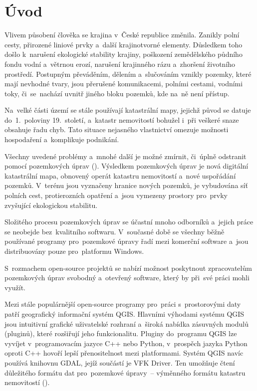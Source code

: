 \chapter{Úvod}
\label{1-uvod}

Vlivem působení člověka se krajina v~České republice změnila. Zanikly polní cesty, přirozené liniové prvky a~další krajinotvorné elementy. Důsledkem toho došlo k~naru\-šení ekologické stability krajiny, poškození zemědělského půdního fondu vodní a~vě\-trnou erozí, narušení krajinného rázu a~zhoršení životního prostředí. Postupným převáděním, dělením a~slučováním vznikly pozemky, které mají nevhodné tvary, jsou přerušené komunikacemi, polními cestami, vodními toky, či~se~nachází uvnitř jiného bloku pozemků, kde na~ně není přístup.

Na~velké části území se stále používají katastrální mapy, jejichž původ se datuje do~1.~poloviny 19.~století, a~katastr nemovitostí bohužel i~při veškeré snaze obsahuje řadu chyb. Tato situace nejasného vlastnictví omezuje možnosti hospodaření a~komplikuje podnikání.

Všechny uvedené problémy a~mnohé další je možné zmírnit, či~úplně odstranit pomocí pozemkových úprav (). Výsledkem pozemkových úprav je nová digi\-tální katastrální mapa, obnovený operát katastru nemovitostí a~nové uspořádání pozemků. V~terénu jsou vyznačeny hranice nových pozemků, je vybudována síť polních cest, protierozních opatření a~jsou vymezeny prostory pro~prvky zvyšující ekologickou stabilitu.

Složitého procesu pozemkových úprav se účastní mnoho odborníků a~jejich práce se neobejde bez~kvalitního softwaru. V~současné době se všechny běžně používané programy pro~pozemkové úpravy řadí mezi komerční software a~jsou distribuovány pouze pro~platformu Windows.

S~rozmachem open-source projektů se nabízí možnost poskytnout zpracovatelům pozemkových úprav svobodný a~otevřený software, který by při~své práci mohli využít.

Mezi stále populárnější open-source programy pro~práci s~prostorovými daty patří geografický informační systém QGIS. Hlavními výhodami systému QGIS jsou intuitivní grafické uživatelské rozhraní a~široká nabídka zásuvných modulů (pluginů), které rozšiřují jeho funkcionalitu. Pluginy do~programu QGIS lze vyvíjet v~programovacím jazyce C++ nebo Python, v~prospěch jazyka Python oproti C++ ho\-voří lepší přenositelnost mezi platformami. Systém QGIS navíc používá knihovnu GDAL, jejíž součástí je VFK Driver. Ten umožňuje čtení důležitého formátu dat pro~pozemkové úpravy~– výměnného formátu katastru nemovitostí ().

